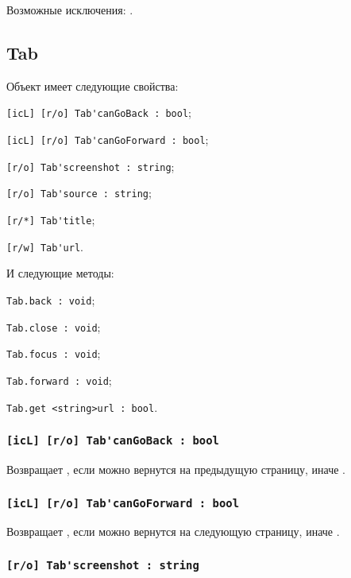 Возможные исключения: .

\subsection{{\color{orange} Tab}}

Объект \tab{} имеет следующие свойства:
\begin{icItems}
	\item \lstinline|[icL] [r/o] Tab'canGoBack : bool|;
	\item \lstinline|[icL] [r/o] Tab'canGoForward : bool|;
	\item \lstinline|[r/o] Tab'screenshot : string|;
	\item \lstinline|[r/o] Tab'source : string|;
	\item \lstinline|[r/*] Tab'title|;
	\item \lstinline|[r/w] Tab'url|.
\end{icItems}

И следующие методы:
\begin{icItems}
	\item \lstinline|Tab.back : void|;
	\item \lstinline|Tab.close : void|;
	\item \lstinline|Tab.focus : void|;
	\item \lstinline|Tab.forward : void|;
	\item \lstinline|Tab.get <string>url : bool|.
\end{icItems}

\subsubsection{\lstinline|[icL] [r/o] Tab'canGoBack : bool|}

Возвращает \true, если можно вернутся на предыдущую страницу, иначе \false.

\subsubsection{\lstinline|[icL] [r/o] Tab'canGoForward : bool|}

Возвращает \true, если можно вернутся на следующую страницу, иначе \false.

\subsubsection{\lstinline|[r/o] Tab'screenshot : string|}

